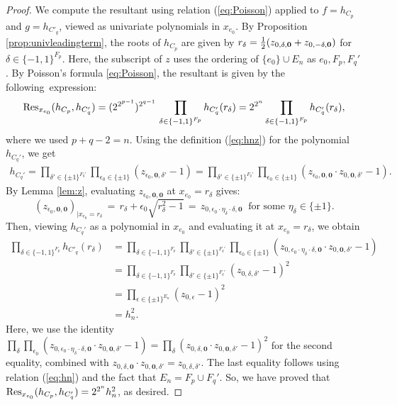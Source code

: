 \documentclass[a4paper, 11pt, twoside]{article}
\newcommand{\azero}{\mathbf{0}}
\theoremstyle{plain}
\begin{document}
\begin{proof}
We compute the resultant using relation (\ref{eq:Poisson}) applied to $f= h_{C_p}$ and $g=h_{C'_q}$, viewed as univariate polynomials in $x_{e_0}$.
By Proposition \ref{prop:univleadingterm}, the roots of $h_{C_p}$ 
are given by 
$r_\delta={1\over 2}(z_{0,\delta,\azero}+z_{0,-\delta,\azero})$ for $ \delta \in \{-1,1\}^{F_p}.$
Here, the subscript of $z$ uses the   ordering of $\{e_0\} \cup E_n$ as $e_0, F_p, F_q'$. 
By Poisson's formula \eqref{eq:Poisson}, the resultant is given by the following~expression:
\[
{\rm Res}_{x_{e_0}}(h_{C_p}, h_{C_q'})= (2^{2^{p-1}})^{2^{q-1}} \, \prod_{\delta \in \{-1,1\}^{F_p}}  h_{C'_q}(r_\delta)=
2^{2^n} \prod_{\delta \in \{-1,1\}^{F_p}}  h_{C'_q}(r_\delta),  \]
where we used $p + q - 2 = n$. Using the definition (\ref{eq:hnz}) for the polynomial $h_{C_q'}$, we get
\begin{align*}
h_{C_q'}= \prod_{\delta'\in\{\pm 1\}^{F_q'}} \prod_{\epsilon_0\in \{\pm 1\}} (z_{\epsilon_0,\azero,\delta'}-1) = 
 \prod_{\delta'\in\{\pm 1\}^{F_q'}} \prod_{\epsilon_0\in \{\pm 1\}} (z_{\epsilon_0,\azero,\azero}\cdot z_{0,\azero,\delta'}-1).
 \end{align*}
By Lemma \ref{lem:z}, evaluating $z_{\epsilon_0,\azero,\azero}$ at $x_{e_0}=r_\delta$ gives:
\[
(z_{\epsilon_0,\azero,\azero})_{|x_{e_0} = r_\delta} \,=\, r_{\delta}+\epsilon_0\sqrt{r_\delta^2-1} \,= \,z_{0,\epsilon_0\cdot \eta_\delta\cdot  \delta,\azero}\ \text{   for some } \eta_\delta\in\{\pm 1\}.
\]
Then, viewing $h_{C_q'}$ as a polynomial in $x_{e_0}$ and evaluating it at $x_{e_0}=r_\delta$, 
   we obtain 
\begin{align*}
\prod_{\delta \in \{-1,1\}^{F_p}}  h_{C'_q}(r_\delta)& =
\prod_{\delta \in \{-1,1\}^{F_p}}  \prod_{\delta'\in\{\pm 1\}^{F_q'}}\prod_{\epsilon_0\in \{\pm 1\}}
(z_{0,\epsilon_0\cdot \eta_\delta\cdot  \delta,\azero}\cdot z_{0,\azero,\delta'}-1)\\
&=
\prod_{\delta \in \{-1,1\}^{F_p}}  \prod_{\delta'\in\{\pm 1\}^{F_q'}}
(z_{0,\delta,\delta'}-1)^2\\
&= \prod_{\epsilon\in \{\pm 1\}^{E_n}} (z_{0,\epsilon}-1)^2\\
&= h_n^2.
\end{align*}
Here,  we use  the identity
$\prod_\delta\prod_{\epsilon_0}(z_{0,\epsilon_0\cdot\eta_\delta \cdot \delta,\azero}\cdot z_{0,\azero,\delta'}-1)=\prod_\delta 
(z_{0,\delta,\azero}\cdot z_{0,\azero,\delta'}-1)^2$ for the second equality, combined with $z_{0,\delta,\azero}\cdot z_{0,\azero,\delta'}=z_{0,\delta,\delta'}$. 
The last equality follows using relation (\ref{eq:hn}) and the fact that $E_n=F_p\cup F_q'$.
So, we have proved that ${\rm Res}_{x_{e_0}}(h_{C_p}, h_{C_q'})=2^{2^{n}} h_n^2$, as desired.
\end{proof}
\end{document}
